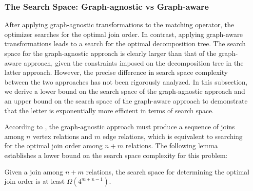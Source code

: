 \subsubsection{The Search Space: Graph-agnostic vs Graph-aware}
\label{sec:compare-search-space}
After applying graph-agnostic transformations to the matching operator, the optimizer searches for the optimal join order. In contrast, applying graph-aware transformations leads to a search for the optimal decomposition tree. The search space for the graph-agnostic approach is clearly larger than that of the graph-aware approach, given the constraints imposed on the decomposition tree in the latter approach. However, the precise difference in search space complexity between the two approaches has not been rigorously analyzed. In this subsection, we derive a lower bound on the search space of the graph-agnostic approach and an upper bound on the search space of the graph-aware approach to demonstrate that the letter is exponentially more efficient in terms of search space.

According to , the graph-agnostic approach must produce a sequence of joins among $n$ vertex relations and $m$ edge relations,
which is equivalent to searching for the optimal join order among $n + m$ relations. The following lemma
establishes a lower bound on the search space complexity for this problem:

\begin{lemma}
\label{lem:complexity-of-volcano}
Given a join among $n + m$ relations, the search space for determining the optimal join order is at least $\Omega(4^{m+n-1})$.
\end{lemma}


